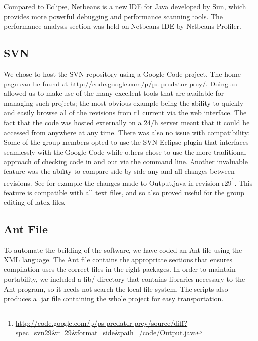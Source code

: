 \documentclass[11pt]{report}
\begin{document}
Compared to Eclipse, Netbeans is a new IDE for Java developed by Sun, which provides more powerful debugging and performance scanning tools. The performance analysis section was held on Netbeans IDE by Netbeans Profiler.  
     
     
      \subsection{SVN} %
      
	We chose to host the SVN repository using a Google Code project. The home page can be found at \href{http://code.google.com/p/ps-predator-prey/}{http://code.google.com/p/ps-predator-prey/}. Doing so allowed us to make use of the many excellent tools that are available for managing such projects; the most obvious example being the ability to quickly and easily browse all of the revisions from r1 current via the web interface.  The fact that the code was hosted externally on a 24/h server meant that it could be accessed from anywhere at any time. There was also no issue with compatibility: Some of the group members opted to use the SVN Eclipse plugin that interfaces seamlessly with the Google Code while others chose to use the more traditional approach of checking code in and out via the command line. Another invaluable feature was the ability to compare side by side any and all changes between revisions. 
	See for example the changes made to Output.java in revision r29\footnote{\href{http://code.google.com/p/ps-predator-prey/source/diff?spec=svn29\&r=29\&format=side\&path=/code/Output.java}{http://code.google.com/p/ps-predator-prey/source/diff?spec=svn29\&r=29\&format=side\&path=/code/Output.java}}.
	 This feature is compatible with all text files, and so also proved useful for the group editing of latex files.	   
 
      
      \subsection{Ant File} %
To automate the building of the software, we have coded an Ant file using the XML language. The Ant file contains the appropriate sections that ensures compilation uses the correct files in the right packages. In order to maintain portability, we included a lib/ directory that contains libraries necessary to the Ant program, so it needs not search the local file system. The scripts also produces a .jar file containing the whole project for easy transportation.  
 
\end{document}
